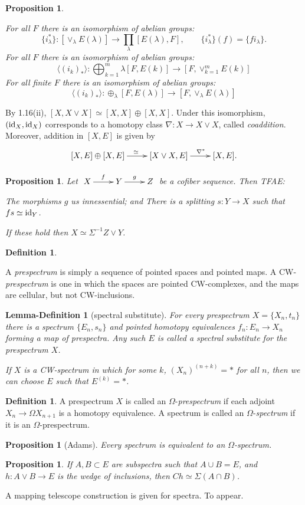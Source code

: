 \documentclass[11pt]{article}
\theoremstyle{plain}
\newtheorem{prop}[thm]{Proposition}
\newtheorem{lemdef}[thm]{Lemma-Definition}
\theoremstyle{definition}
\newtheorem{defn}[thm]{Definition}
\begin{document}
\begin{prop}\hfil
\begin{itemise}
\itm[(i)]For all $F$ there is an isomorphism of abelian groups:
\[\{i^*_\lambda\}:[\vee_\lambda E(\lambda)]\to\prod_\lambda[E(\lambda),F],
\qquad\{i^*_\lambda\}(f)=\{fi_\lambda\}.\]
\itm[(ii)]For all $F$ there is an isomorphism of abelian groups:
\[\langle(i_k)_*\rangle:\bigoplus_{k=1}^m\lambda[F,E(k)]\to
[F,\vee_{k=1}^m E(k)]\]
\itm[(iii)]For all finite $F$ there is an isomorphism of abelian groups:
\[\langle(i_k)_*\rangle:\oplus_\lambda[F,E(\lambda)]\to
[F,\vee_\lambda E(\lambda)]\]
\end{itemise}
\end{prop}
\noindent By 1.16(ii), $[X,X\vee X]\simeq[X,X]\oplus[X,X]$. Under this
isomorphism, $(\textup{id}_X,\textup{id}_X)$ corresponds to a homotopy class $\nabla:X\to X\vee
X$, called \emph{coaddition}. Moreover, addition in $[X,E]$ is given by
\[\xymatrix{[X,E]\oplus[X,E]\ar[r]^{\ \ \simeq}&
[X\vee X,E]\ar[r]^{\ \ \ \nabla^*}&[X,E].}\]
\begin{prop}
Let $\xymatrix{X\ar[r]^f&Y\ar[r]^g&Z}$ be a cofiber sequence. Then TFAE:
\begin{itemise}
\itm[(i)]The morphisms $g$ us innessential; and
\itm[(ii)]There is a splitting $s:Y\to X$ such that $fs\simeq\textup{id}_Y$.
\end{itemise}
If these hold then $X\simeq \Sigma^{-1}Z\vee Y$.
\end{prop}
\begin{defn}\hfil
\begin{itemise}
\itm A \emph{prespectrum} is simply a sequence of pointed spaces and pointed
maps.
\itm A CW-\emph{prespectrum} is one in which the spaces are pointed
CW-complexes, and the maps are cellular, but not CW-inclusions.
\end{itemise}
\end{defn}
\begin{lemdef}[spectral substitute]
For every prespectrum $X=\{X_n,t_n\}$ there is a spectrum $\{E_n,s_n\}$ and
pointed homotopy equivalences $f_n:E_n\to X_n$ forming a map of prespectra. Any
such $E$ is called a \emph{spectral substitute} for the prespectrum $X$.

If $X$ is a CW-spectrum in which for some $k$, $(X_n)^{(n+k)}=*$ for all $n$,
then we can choose $E$ such that $E^{(k)}=*$.
\end{lemdef}
\begin{defn}
A prespectrum $X$ is called an $\Omega$-\emph{prespectrum} if each adjoint
$X_n\to \Omega X_{n+1}$ is a homotopy equivalence. A spectrum is called an
$\Omega$-\emph{spectrum} if it is an $\Omega$-prespectrum.
\end{defn}
\begin{prop}[Adams]
Every spectrum is equivalent to an $\Omega$-spectrum.
\end{prop}
\begin{prop}
If $A,B\subset E$ are subspectra such that $A\cup B=E$, and $h:A\vee B\to E$ is
the wedge of inclusions, then $Ch\simeq\Sigma(A\cap B)$.
\end{prop}
\noindent A mapping telescope construction is given for spectra. To appear.
\end{document}

